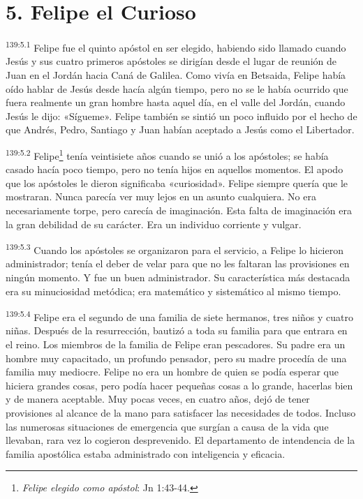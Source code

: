 \section*{5. Felipe el Curioso}
\par 
\textsuperscript{139:5.1} Felipe fue el quinto apóstol en ser elegido, habiendo sido llamado cuando Jesús y sus cuatro primeros apóstoles se dirigían desde el lugar de reunión de Juan en el Jordán hacia Caná de Galilea. Como vivía en Betsaida, Felipe había oído hablar de Jesús desde hacía algún tiempo, pero no se le había ocurrido que fuera realmente un gran hombre hasta aquel día, en el valle del Jordán, cuando Jesús le dijo: «Sígueme». Felipe también se sintió un poco influido por el hecho de que Andrés, Pedro, Santiago y Juan habían aceptado a Jesús como el Libertador.

\par 
\textsuperscript{139:5.2} Felipe\footnote{\textit{Felipe elegido como apóstol}: Jn 1:43-44.} tenía veintisiete años cuando se unió a los apóstoles; se había casado hacía poco tiempo, pero no tenía hijos en aquellos momentos. El apodo que los apóstoles le dieron significaba «curiosidad». Felipe siempre quería que le mostraran. Nunca parecía ver muy lejos en un asunto cualquiera. No era necesariamente torpe, pero carecía de imaginación. Esta falta de imaginación era la gran debilidad de su carácter. Era un individuo corriente y vulgar.

\par 
\textsuperscript{139:5.3} Cuando los apóstoles se organizaron para el servicio, a Felipe lo hicieron administrador; tenía el deber de velar para que no les faltaran las provisiones en ningún momento. Y fue un buen administrador. Su característica más destacada era su minuciosidad metódica; era matemático y sistemático al mismo tiempo.

\par 
\textsuperscript{139:5.4} Felipe era el segundo de una familia de siete hermanos, tres niños y cuatro niñas. Después de la resurrección, bautizó a toda su familia para que entrara en el reino. Los miembros de la familia de Felipe eran pescadores. Su padre era un hombre muy capacitado, un profundo pensador, pero su madre procedía de una familia muy mediocre. Felipe no era un hombre de quien se podía esperar que hiciera grandes cosas, pero podía hacer pequeñas cosas a lo grande, hacerlas bien y de manera aceptable. Muy pocas veces, en cuatro años, dejó de tener provisiones al alcance de la mano para satisfacer las necesidades de todos. Incluso las numerosas situaciones de emergencia que surgían a causa de la vida que llevaban, rara vez lo cogieron desprevenido. El departamento de intendencia de la familia apostólica estaba administrado con inteligencia y eficacia.

